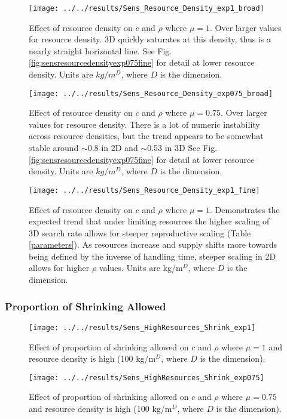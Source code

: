 \begin{refsection}
\begin{figure}[H]
	\centering
	\texttt{[image: ../../results/Sens\_Resource\_Density\_exp1\_broad]}
	\caption{Effect of resource density on $c$ and $\rho$ where $\mu = 1$.  Over larger values for resource density.  3D quickly saturates at this density, thus is a nearly straight horizontal line.  See Fig. \ref{fig:sensresourcedensityexp075fine} for detail at lower resource density.  Units are $kg/m^D$, where $D$ is the dimension.}
	\label{fig:sensresourcedensityexp1broad}
\end{figure}
\begin{figure}[h]
	\centering
	\texttt{[image: ../../results/Sens\_Resource\_Density\_exp075\_broad]}
	\caption{Effect of resource density on $c$ and $\rho$ where $\mu = 0.75$.  Over larger values for resource density.  There is a lot of numeric instability across resource densities, but the trend appears to be somewhat stable around $\sim$0.8 in 2D and $\sim$0.53 in 3D See Fig. \ref{fig:sensresourcedensityexp075fine} for detail at lower resource density.  Units are $kg/m^D$, where $D$ is the dimension.}
	\label{fig:sensresourcedensityexp075broad}
\end{figure}
	\begin{figure}[h!]
	\centering
	\texttt{[image: ../../results/Sens\_Resource\_Density\_exp1\_fine]}
	\caption{Effect of resource density on $c$ and $\rho$ where $\mu = 1$.  Demonstrates the expected trend that under limiting resources the higher scaling of 3D search rate  allows for steeper reproductive scaling (Table \ref{parameters}).  As resources increase and supply shifts more towards being defined by the inverse of handling time, steeper scaling in 2D allows for higher $\rho$ values.  Units are kg/m$^D$, where $D$ is the dimension.}
	\label{fig:sensresourcedensityexp1fine}
\end{figure}





\subsubsection{Proportion of Shrinking Allowed}
\begin{figure}[H]
	\centering
	\texttt{[image: ../../results/Sens\_HighResources\_Shrink\_exp1]}
	\caption{Effect of proportion of shrinking allowed on $c$ and $\rho$ where $\mu = 1$ and resource density is high (100 kg/m$^D$, where $D$ is the dimension).}
	\label{fig:senshighresourcesshrinkexp1}
\end{figure}
\begin{figure}[h]
	\centering
	\texttt{[image: ../../results/Sens\_HighResources\_Shrink\_exp075]}
	\caption{Effect of proportion of shrinking allowed on $c$ and $\rho$ where $\mu = 0.75$ and resource density is high (100 kg/m$^D$, where $D$ is the dimension).}
	\label{fig:senshighresourcesshrinkexp075}
\end{figure}


\end{refsection}
